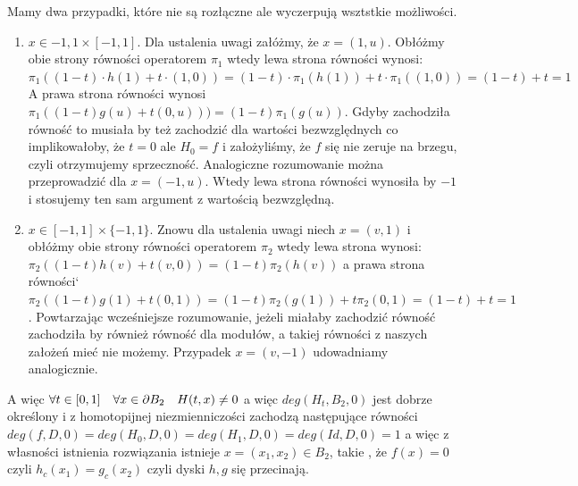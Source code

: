   Mamy dwa przypadki, które nie są rozłączne ale wyczerpują wsztstkie możliwości.
  \begin{enumerate}
   \item $ x \in {-1,1} \times [-1,1] $. \newline
    Dla ustalenia uwagi załóżmy, że $ x = (1,u) $. Obłóżmy obie strony równości operatorem $ \pi_1$ 
    wtedy lewa strona równości wynosi:
    $\pi_1((1-t) \cdot h(1) + t \cdot (1,0)) = (1-t) \cdot \pi_1(h(1)) + t \cdot \pi_1((1,0)) = (1-t) + t = 1$
    A prawa strona równości wynosi $ \pi_1( (1-t)g(u) + t(0,u) )) = (1-t)\pi_1(g(u)) $.
    Gdyby zachodziła równość to musiała by też zachodzić dla wartości bezwzględnych co implikowałoby,
    że $ t = 0 $ ale $ H_0 = f $ i założyliśmy, że $ f $ się nie zeruje na brzegu, czyli otrzymujemy sprzeczność.
    Analogiczne rozumowanie można przeprowadzić dla $ x = (-1,u) $. Wtedy lewa strona równości wynosiła by $ -1 $ 
    i stosujemy ten sam argument z wartością bezwzględną.
    
    \item $ x \in [-1,1]\times \{ -1,1\} $. \newline
    Znowu dla ustalenia uwagi niech $ x = (v,1) $ i obłóżmy obie strony równości operatorem  $ \pi_2 $
    wtedy lewa strona wynosi:
    $ \pi_2((1-t)h(v) + t(v,0)) = (1-t)\pi_2(h(v)) $
    a prawa strona równości`
   $ \pi_2( (1-t)g(1) + t(0,1)) = (1-t)\pi_2(g(1)) + t\pi_2(0,1)  = (1-t) + t = 1 $.
   Powtarzając wcześniejsze rozumowanie, jeżeli miałaby zachodzić równość zachodziła by również równość dla modułów, a takiej równości z 
   naszych założeń mieć nie możemy. Przypadek $ x = (v,-1) $ udowadniamy analogicznie.
   
  \end{enumerate}
  
  A więc $ \forall t \in [0,1] \quad \forall x \in \partial B_2 \quad H(t,x) \neq 0 $ a więc $ deg(H_t,B_2,0) $ jest dobrze określony i 
  z homotopijnej niezmienniczości zachodzą następujące równości
  $ deg (f,D,0) = deg(H_0,D,0) = deg(H_1,D,0) = deg(Id,D,0) = 1 $ 
  a więc z własności istnienia rozwiązania istnieje $ x = (x_1,x_2) \in B_2 $, takie , że $f(x) = 0 $ czyli 
  $ h_c(x_1) = g_c(x_2) $ czyli dyski $h,g$ się przecinają.
  





